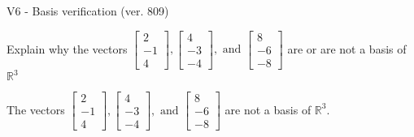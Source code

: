\begin{exercise}
  \begin{exerciseTitle}V6 - Basis verification (ver. 809)\end{exerciseTitle}
  \begin{exerciseStatement}
    Explain why the vectors \(\left[\begin{array}{r}
2 \\
-1 \\
4
\end{array}\right] , \left[\begin{array}{r}
4 \\
-3 \\
-4
\end{array}\right] , \text{ and } \left[\begin{array}{r}
8 \\
-6 \\
-8
\end{array}\right]\) are or are not a basis of \(\mathbb{R}^3\)	


  \end{exerciseStatement}
  \begin{exerciseAnswer}
   The vectors \(\left[\begin{array}{r}
2 \\
-1 \\
4
\end{array}\right] , \left[\begin{array}{r}
4 \\
-3 \\
-4
\end{array}\right] , \text{ and } \left[\begin{array}{r}
8 \\
-6 \\
-8
\end{array}\right]\) 
  	 are not  a basis of \(\mathbb{R}^3\).
  


  \end{exerciseAnswer}
\end{exercise}